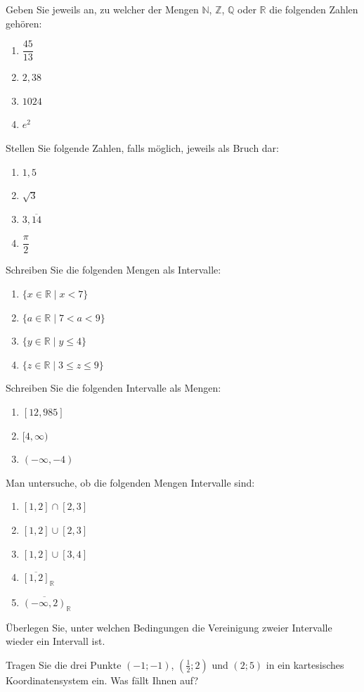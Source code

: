 \begin{uebungsaufgaben}
  \item Geben Sie jeweils an, zu welcher der Mengen $\mathbb{N}$, $\mathbb{Z}$, $\mathbb{Q}$ oder $\mathbb{R}$ die folgenden Zahlen gehören:
    \begin{enumerate}[label=\alph*)]
      \item $\dfrac{45}{13}$
      \item $2{,}38$
      \item $1024$
      \item $e^2$
    \end{enumerate}
  \item Stellen Sie folgende Zahlen, falls möglich, jeweils als Bruch dar:
    \begin{enumerate}[label=\alph*)]
      \item $1{,}5$
      \item $\sqrt{3}$
      \item $3{,}\overline{14}$
      \item $\dfrac{\pi}{2}$
    \end{enumerate}
  \item Schreiben Sie die folgenden Mengen als Intervalle:
    \begin{enumerate}[label=\alph*)]
      \item $\{x \in \mathbb{R} \mid x < 7\}$
      \item $\{a \in \mathbb{R} \mid 7 < a < 9\}$
      \item $\{y \in \mathbb{R} \mid y \leq 4\}$
      \item $\{z \in \mathbb{R} \mid 3 \leq z \leq 9\}$
    \end{enumerate}
  \item Schreiben Sie die folgenden Intervalle als Mengen:
    \begin{enumerate}[label=\alph*)]
      \item $[12,985]$
      \item $[4,\infty)$
      \item $(-\infty,-4)$
    \end{enumerate}
  \item Man untersuche, ob die folgenden Mengen Intervalle sind:
    \begin{enumerate}[label=\alph*)]
      \item $[1,2] \cap [2,3]$
      \item $[1,2] \cup [2,3]$
      \item $[1,2] \cup [3,4]$
      \item $\overline{[1,2]}_{\mathbb{R}}$
      \item $\overline{(-\infty,2)}_{\mathbb{R}}$
    \end{enumerate}
  \item Überlegen Sie, unter welchen Bedingungen die Vereinigung zweier Intervalle wieder ein Intervall ist.
  \item Tragen Sie die drei Punkte $(-1;-1)$, $(\tfrac{1}{2};2)$ und $(2;5)$ in ein kartesisches Koordinatensystem ein. Was fällt Ihnen auf?
\end{uebungsaufgaben}

